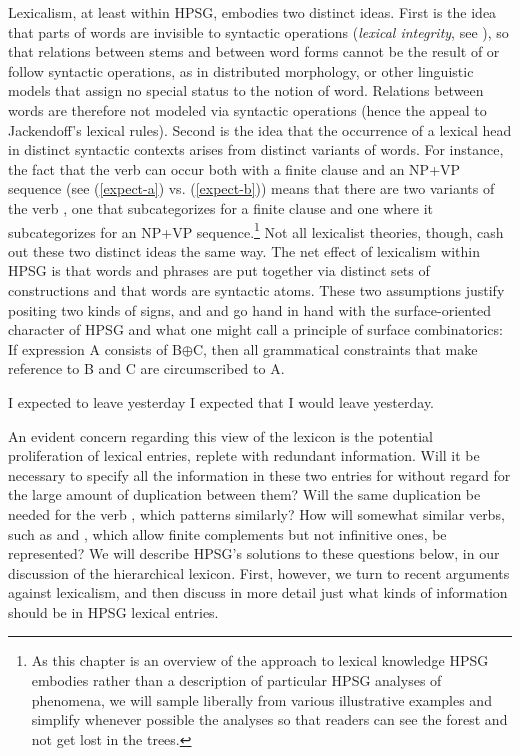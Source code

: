 \documentclass[output=paper]{langsci/langscibook}
\begin{document}
Lexicalism, at least within HPSG, embodies two distinct ideas. First is the idea that parts of words are invisible to syntactic operations (\emph{lexical integrity}, see \citealt{BresnanandMchombo1995}), so that relations between stems and between word forms cannot be the result of or follow syntactic operations, as in distributed morphology, or other linguistic models that assign no special status to the notion of word. Relations between words are therefore not modeled via syntactic operations (hence the appeal to Jackendoff's lexical rules). Second is the idea that the occurrence of a lexical head in distinct syntactic contexts arises from distinct variants of words. For instance, the fact that the verb  can occur both with a finite clause and an NP+VP sequence (see (\ref{expect-a}) vs. (\ref{expect-b})) means that there are two variants of the verb , one that subcategorizes for a finite clause and one where it subcategorizes for an NP+VP sequence.\footnote{As this chapter is an overview of the approach to lexical knowledge HPSG embodies rather than a description of particular HPSG analyses of phenomena, we will sample liberally from various illustrative examples and simplify whenever possible the analyses so that readers can see the forest and not get lost in the trees.} Not all lexicalist theories, though, cash out these two distinct ideas the same way. The net effect of lexicalism within HPSG is that words and phrases are put together via distinct sets of constructions and that words are syntactic atoms. These two assumptions justify positing two kinds of signs,  and  and go hand in hand with the surface-oriented character of HPSG and what one might call a principle of surface combinatorics: If expression A consists of B$\oplus$C, then all grammatical constraints that make reference to B and C are circumscribed to A. 

\begin{exe}
	\ex \label{expect-a} I expected to leave yesterday
	\ex \label{expect-b} I expected that I would leave yesterday.
\end{exe}

An evident concern regarding this view of the lexicon is the potential proliferation of lexical entries, replete with redundant information. Will it be necessary to specify all the information in these two entries for  without regard for the large amount of duplication between them? Will the same duplication be needed for the verb  , which patterns similarly? How will somewhat similar verbs, such as  and , which allow finite complements but not infinitive ones, be represented? We will describe HPSG's solutions to these questions below, in our discussion of the hierarchical lexicon. First, however, we turn to recent arguments against lexicalism, and then discuss in more detail just what kinds of information should be in HPSG lexical entries.
\end{document}
